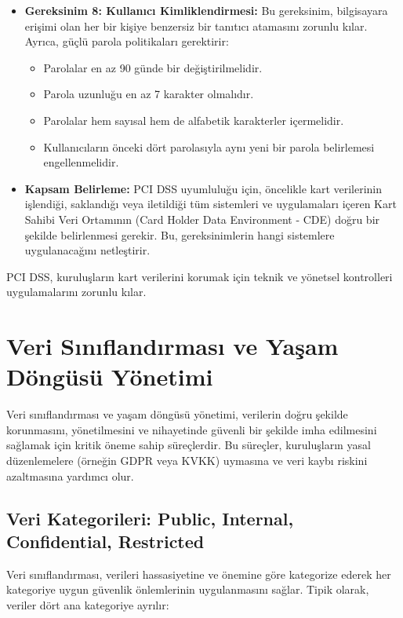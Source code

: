 \begin{itemize}
    \item \textbf{Gereksinim 8: Kullanıcı Kimliklendirmesi:} Bu gereksinim, bilgisayara erişimi olan her bir kişiye benzersiz bir tanıtıcı atamasını zorunlu kılar. Ayrıca, güçlü parola politikaları gerektirir:
    \begin{itemize}
        \item Parolalar en az 90 günde bir değiştirilmelidir.
        \item Parola uzunluğu en az 7 karakter olmalıdır.
        \item Parolalar hem sayısal hem de alfabetik karakterler içermelidir.
        \item Kullanıcıların önceki dört parolasıyla aynı yeni bir parola belirlemesi engellenmelidir.
    \end{itemize}
    \item \textbf{Kapsam Belirleme:} PCI DSS uyumluluğu için, öncelikle kart verilerinin işlendiği, saklandığı veya iletildiği tüm sistemleri ve uygulamaları içeren Kart Sahibi Veri Ortamının (Card Holder Data Environment - CDE) doğru bir şekilde belirlenmesi gerekir. Bu, gereksinimlerin hangi sistemlere uygulanacağını netleştirir.
\end{itemize}

PCI DSS, kuruluşların kart verilerini korumak için teknik ve yönetsel kontrolleri uygulamalarını zorunlu kılar.

\section{Veri Sınıflandırması ve Yaşam Döngüsü Yönetimi}

Veri sınıflandırması ve yaşam döngüsü yönetimi, verilerin doğru şekilde korunmasını, yönetilmesini ve nihayetinde güvenli bir şekilde imha edilmesini sağlamak için kritik öneme sahip süreçlerdir. Bu süreçler, kuruluşların yasal düzenlemelere (örneğin GDPR veya KVKK) uymasına ve veri kaybı riskini azaltmasına yardımcı olur.

\subsection{Veri Kategorileri: Public, Internal, Confidential, Restricted}

Veri sınıflandırması, verileri hassasiyetine ve önemine göre kategorize ederek her kategoriye uygun güvenlik önlemlerinin uygulanmasını sağlar. Tipik olarak, veriler dört ana kategoriye ayrılır:

